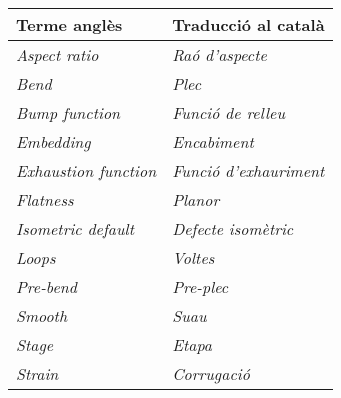 \begin{center}
    \begin{tabular}{ll}
    \hline
    \textbf{Terme anglès} & \textbf{Traducció al català} \\
    \hline
    \textit{Aspect ratio} & \textit{Raó d'aspecte} \\
    \textit{Bend} & \textit{Plec} \\
    \textit{Bump function} & \textit{Funció de relleu} \\
    \textit{Embedding} & \textit{Encabiment} \\
    \textit{Exhaustion function} & \textit{Funció d'exhauriment} \\
    \textit{Flatness} & \textit{Planor} \\
    \textit{Isometric default} & \textit{Defecte isomètric} \\
    \textit{Loops} & \textit{Voltes} \\
    \textit{Pre-bend} & \textit{Pre-plec} \\
    \textit{Smooth} & \textit{Suau} \\
    \textit{Stage} & \textit{Etapa} \\
    \textit{Strain} & \textit{Corrugació} \\
    \hline
    \end{tabular}
\end{center}
\newpage
{}
\setcounter{page}{1}
